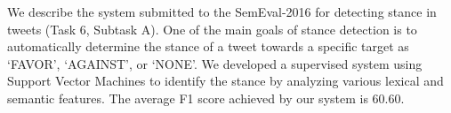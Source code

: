 We describe the system submitted to the SemEval-2016 for detecting stance in tweets (Task 6, Subtask A). One of the main goals of stance detection is to automatically determine the stance of a tweet towards a specific target as ‘FAVOR', ‘AGAINST', or ‘NONE'. We developed a supervised system using Support Vector Machines to identify the stance by analyzing various lexical and semantic features. The average F1 score achieved by our system is 60.60.
